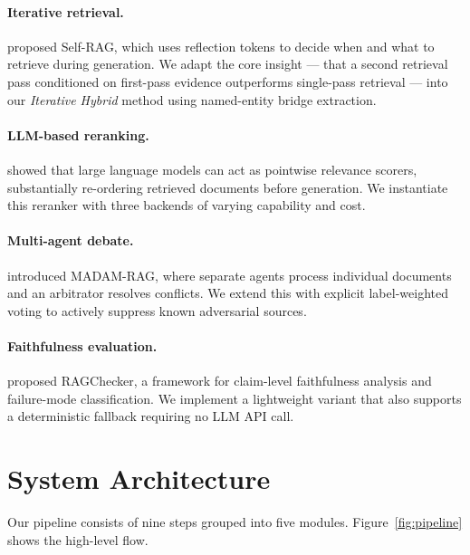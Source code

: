 \documentclass{article}
\begin{document}
\paragraph{Iterative retrieval.}
\citet{asai2023selfrag} proposed Self-RAG, which uses reflection
tokens to decide when and what to retrieve during generation.  We
adapt the core insight — that a second retrieval pass conditioned on
first-pass evidence outperforms single-pass retrieval — into our
\emph{Iterative Hybrid} method using named-entity bridge extraction.

\paragraph{LLM-based reranking.}
\citet{yu2024rankrag} showed that large language models can act as
pointwise relevance scorers, substantially re-ordering retrieved
documents before generation.  We instantiate this reranker with
three backends of varying capability and cost.

\paragraph{Multi-agent debate.}
\citet{yoran2024madam} introduced MADAM-RAG, where separate agents
process individual documents and an arbitrator resolves conflicts.
We extend this with explicit label-weighted voting to actively
suppress known adversarial sources.

\paragraph{Faithfulness evaluation.}
\citet{ru2024ragchecker} proposed RAGChecker, a framework for
claim-level faithfulness analysis and failure-mode classification.
We implement a lightweight variant that also supports a deterministic
fallback requiring no LLM API call.

\section{System Architecture}
\label{sec:architecture}

Our pipeline consists of nine steps grouped into five modules.
Figure~\ref{fig:pipeline} shows the high-level flow.
\end{document}
